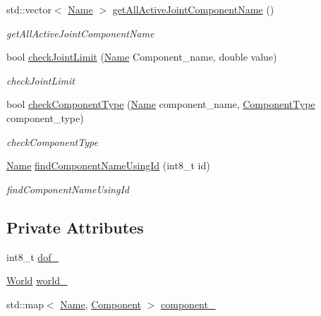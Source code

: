 \begin{DoxyCompactItemize}
std\+::vector$<$ \hyperlink{namespacerobotis__manipulator_a08c2d25e77a01ad75b9bb740f8ce4765}{Name} $>$ \hyperlink{classrobotis__manipulator_1_1_manipulator_af746f90412f3a1f08dee32a855ca177c}{get\+All\+Active\+Joint\+Component\+Name} ()
\begin{DoxyCompactList}\small\item\em get\+All\+Active\+Joint\+Component\+Name \end{DoxyCompactList}\item 
bool \hyperlink{classrobotis__manipulator_1_1_manipulator_a715e5825f289765d1c6ce9687ce6c6e5}{check\+Joint\+Limit} (\hyperlink{namespacerobotis__manipulator_a08c2d25e77a01ad75b9bb740f8ce4765}{Name} Component\+\_\+name, double value)
\begin{DoxyCompactList}\small\item\em check\+Joint\+Limit \end{DoxyCompactList}\item 
bool \hyperlink{classrobotis__manipulator_1_1_manipulator_a5b1f27b9cc2875b4e0275e3b88ab1b28}{check\+Component\+Type} (\hyperlink{namespacerobotis__manipulator_a08c2d25e77a01ad75b9bb740f8ce4765}{Name} component\+\_\+name, \hyperlink{namespacerobotis__manipulator_a2bbf89d1c08dc1d9ff4e28beb939e382}{Component\+Type} component\+\_\+type)
\begin{DoxyCompactList}\small\item\em check\+Component\+Type \end{DoxyCompactList}\item 
\hyperlink{namespacerobotis__manipulator_a08c2d25e77a01ad75b9bb740f8ce4765}{Name} \hyperlink{classrobotis__manipulator_1_1_manipulator_a9f8406b7a5be743cc2dfc29a9f7ea647}{find\+Component\+Name\+Using\+Id} (int8\+\_\+t id)
\begin{DoxyCompactList}\small\item\em find\+Component\+Name\+Using\+Id \end{DoxyCompactList}\end{DoxyCompactItemize}
\subsection*{Private Attributes}
\begin{DoxyCompactItemize}
\item 
int8\+\_\+t \hyperlink{classrobotis__manipulator_1_1_manipulator_a39092ac588acd5e8713b55e18b85aebb}{dof\+\_\+}
\item 
\hyperlink{structrobotis__manipulator_1_1_world}{World} \hyperlink{classrobotis__manipulator_1_1_manipulator_a2da05841bad220ca4072a11649777bb6}{world\+\_\+}
\item 
std\+::map$<$ \hyperlink{namespacerobotis__manipulator_a08c2d25e77a01ad75b9bb740f8ce4765}{Name}, \hyperlink{structrobotis__manipulator_1_1_component}{Component} $>$ \hyperlink{classrobotis__manipulator_1_1_manipulator_a20b388b821f161972c2cf737fe1c26db}{component\+\_\+}
\end{DoxyCompactItemize}


